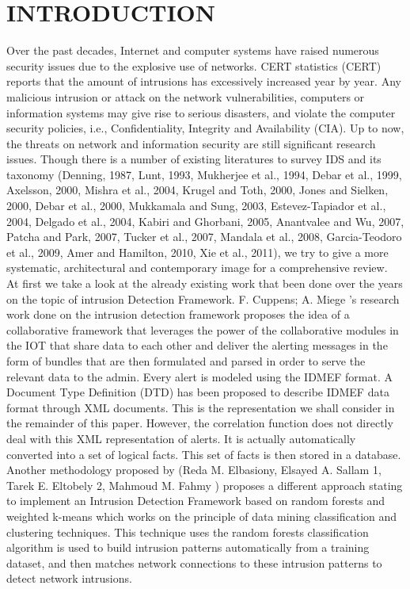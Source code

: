 \documentclass[letterpaper, 10 pt, conference]{ieeeconf}  %
\begin{document}
\section{INTRODUCTION}
Over the past decades, Internet and computer systems have raised numerous security issues due to the explosive use of networks. CERT statistics (CERT) reports that the amount of intrusions has excessively increased year by year. Any malicious intrusion or attack on the network vulnerabilities, computers or information systems may give rise to serious disasters, and violate the computer security policies, i.e., Confidentiality, Integrity and Availability (CIA). Up to now, the threats on network and information security are still significant research issues. Though there is a number of existing literatures to survey IDS and its taxonomy (Denning, 1987, Lunt, 1993, Mukherjee et al., 1994, Debar et al., 1999, Axelsson, 2000, Mishra et al., 2004, Krugel and Toth, 2000, Jones and Sielken, 2000, Debar et al., 2000, Mukkamala and Sung, 2003, Estevez-Tapiador et al., 2004, Delgado et al., 2004, Kabiri and Ghorbani, 2005, Anantvalee and Wu, 2007, Patcha and Park, 2007, Tucker et al., 2007, Mandala et al., 2008, Garcia-Teodoro et al., 2009, Amer and Hamilton, 2010, Xie et al., 2011), we try to give a more systematic, architectural and contemporary image for a comprehensive review. \\

At first we take a look at the already existing work that been done over the years on the topic of intrusion Detection Framework. F. Cuppens; A. Miege 's research work done on the intrusion detection framework proposes the idea of a collaborative framework that leverages the power of the collaborative modules in the IOT that share data to each other and deliver the alerting messages in the form of bundles that are then formulated and parsed in order to serve the relevant data to the admin. Every alert is modeled using the IDMEF format. A Document Type Definition (DTD) has been proposed to describe IDMEF data format through XML documents. This is the representation we shall
consider in the remainder of this paper. However, the correlation function does not directly deal with this XML representation of alerts. It is actually
automatically converted into a set of logical facts. This set
of facts is then stored in a database. \cite{c7}\\

Another methodology proposed by (Reda M. Elbasiony, Elsayed A. Sallam 1, Tarek E. Eltobely 2, Mahmoud M. Fahmy ) proposes a different approach stating to implement an Intrusion Detection Framework based on random forests and weighted k-means which works on the principle of data mining classification and clustering techniques. This technique uses the random forests classification algorithm is used to build intrusion patterns automatically from a training dataset, and then matches network connections to these intrusion patterns to detect network intrusions. 
\end{document}
